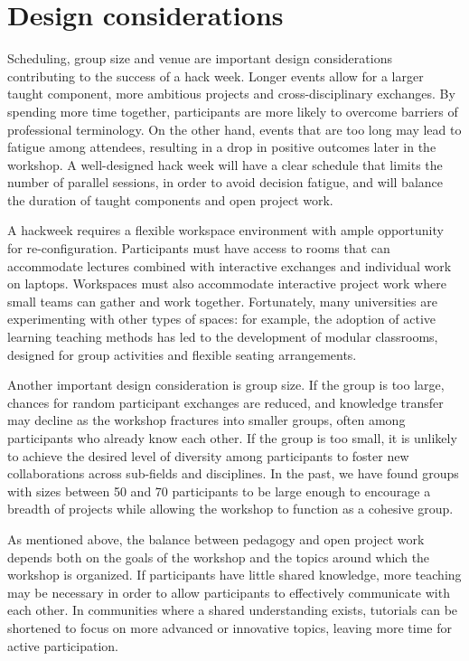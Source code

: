 \section*{Design considerations}

Scheduling, group size and venue are important design considerations contributing to the success of a hack week.   
Longer events allow for a larger taught component, more ambitious projects and cross-disciplinary exchanges. 
By spending more time together, participants are more likely to overcome barriers of professional terminology.
On the other hand, events that are too long may lead to fatigue among attendees, resulting in a drop in positive outcomes later in the workshop.
A well-designed hack week will have a clear schedule that limits the number of parallel sessions, in order to avoid decision fatigue, and will balance the duration of taught components and open project work. 

A hackweek requires a flexible workspace environment with ample opportunity for re-configuration. 
Participants must have access to rooms that can accommodate lectures combined with interactive exchanges and individual work on laptops. 
Workspaces must also accommodate interactive project work where small teams can gather and work together.    
Fortunately, many universities are experimenting with other types of spaces: for example, the adoption of active learning teaching methods \cite{prince2004} has led to the development of modular classrooms, designed for group activities and flexible seating arrangements.

Another important design consideration is group size.
If the group is too large, chances for random participant exchanges are reduced, and knowledge transfer may decline as the workshop fractures into smaller groups, often among participants who already know each other.
If the group is too small, it is unlikely to achieve the desired level of diversity among participants to foster new collaborations across sub-fields and disciplines.
In the past, we have found groups with sizes between 50 and 70 participants to be large enough to encourage a breadth of projects while allowing the workshop to function as a cohesive group.

As mentioned above, the balance between pedagogy and open project work depends both on the goals of the workshop and the topics around which the workshop is organized.
If participants have little shared knowledge, more teaching may be necessary in order to allow participants to effectively communicate with each other.
In communities where a shared understanding exists, tutorials can be shortened to focus on more advanced or innovative topics, leaving more time for active participation.

